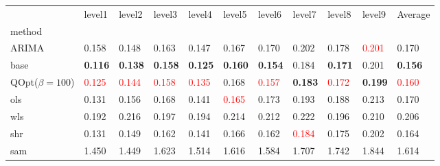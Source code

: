 \begin{tabular}{lllllllllll}
\toprule
 & level1 & level2 & level3 & level4 & level5 & level6 & level7 & level8 & level9 & Average \\
method &  &  &  &  &  &  &  &  &  &  \\
\midrule
ARIMA & 0.158 & 0.148 & 0.163 & 0.147 & 0.167 & 0.170 & 0.202 & 0.178 & \textcolor{red}{0.201} & 0.170 \\
base & \textbf{0.116} & \textbf{0.138} & \textbf{0.158} & \textbf{0.125} & \textbf{0.160} & \textbf{0.154} & 0.184 & \textbf{0.171} & 0.201 & \textbf{0.156} \\
\midrule
QOpt($\beta=100$) & \textcolor{red}{0.125} & \textcolor{red}{0.144} & \textcolor{red}{0.158} & \textcolor{red}{0.135} & 0.168 & \textcolor{red}{0.157} & \textbf{0.183} & \textcolor{red}{0.172} & \textbf{0.199} & \textcolor{red}{0.160} \\
ols & 0.131 & 0.156 & 0.168 & 0.141 & \textcolor{red}{0.165} & 0.173 & 0.193 & 0.188 & 0.213 & 0.170 \\
wls & 0.192 & 0.216 & 0.197 & 0.194 & 0.214 & 0.212 & 0.222 & 0.196 & 0.210 & 0.206 \\
shr & 0.131 & 0.149 & 0.162 & 0.141 & 0.166 & 0.162 & \textcolor{red}{0.184} & 0.175 & 0.202 & 0.164 \\
sam & 1.450 & 1.449 & 1.623 & 1.514 & 1.616 & 1.584 & 1.707 & 1.742 & 1.844 & 1.614 \\
\bottomrule
\end{tabular}